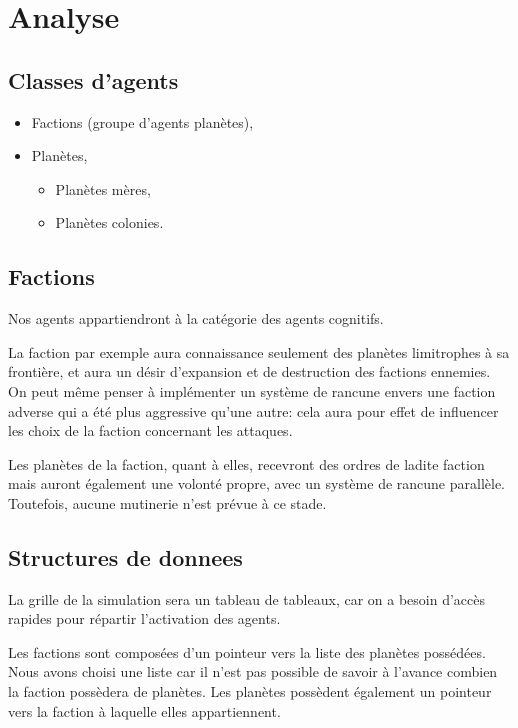 \documentclass{article}
\begin{document}
  \section{Analyse}
    \subsection{Classes d'agents}
      \begin{itemize}
        \item Factions (groupe d'agents planètes),
        \item Planètes,
        \begin{itemize}
          \item Planètes mères,
          \item Planètes colonies.
        \end{itemize}
      \end{itemize}

    \subsection{Factions}
      Nos agents appartiendront à la catégorie des agents cognitifs. 

      La faction par exemple aura connaissance seulement des planètes limitrophes à sa frontière, et aura un désir d'expansion et de destruction des factions ennemies. On peut même penser à implémenter un système de rancune envers une faction adverse qui a été plus aggressive qu'une autre: cela aura pour effet de influencer les choix de la faction concernant les attaques.

      Les planètes de la faction, quant à elles, recevront des ordres de ladite faction mais auront également une volonté propre, avec un système de rancune parallèle. Toutefois, aucune mutinerie n'est prévue à ce stade.

    
    \subsection{Structures de donnees}
    La grille de la simulation sera un tableau de tableaux, car on a besoin d'accès rapides pour répartir l'activation des agents.

    Les factions sont composées d'un pointeur vers la liste des planètes possédées. Nous avons choisi une liste car il n'est pas possible de savoir à l'avance combien la faction possèdera de planètes. Les planètes possèdent également un pointeur vers la faction à laquelle elles appartiennent.
\end{document}
